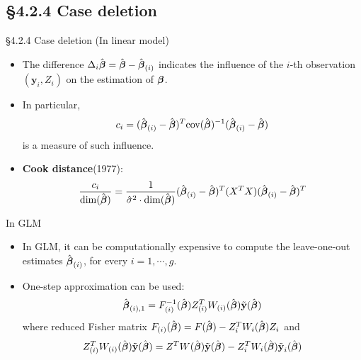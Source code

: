 \documentclass{beamer}
\newcommand{\currentsubsection}{}
\let\oldsubsection\subsection
\renewcommand{\subsection}[1]{\oldsubsection{#1}\renewcommand{\currentsubsection}{#1}}
\begin{document}
\subsection{\S4.2.4 Case deletion}
\begin{frame}{\S4.2.4 Case deletion (In linear model) }
\begin{itemize}
\item
The  difference $\Delta_i\hat{\mbox{\boldmath $\beta$}} = \hat{\mbox{\boldmath $\beta$}}-
\hat{\mbox{\boldmath $\beta$}}_{(i)}$ indicates the influence of the $i$-th observation $(\textbf{y}_i, Z_i)$ on the estimation of
$\mbox{\boldmath $\beta$}$.
\item
In particular, 
$$c_i=(\hat{\mbox{\boldmath $\beta$}}_{(i)}-\hat{\mbox{\boldmath $\beta$}})^T
\mbox{cov}(\hat{\mbox{\boldmath $\beta$}})^{-1}(\hat{\mbox{\boldmath $\beta$}}_{(i)}-
\hat{\mbox{\boldmath $\beta$}})$$ 
is a measure of such influence.
\item {\bf Cook distance}(1977): 
\[ \frac{c_i}{\dim (\hat{\mbox{\boldmath $\beta$}})}=\frac{1}{\hat{\sigma}^2
\cdot \dim (\hat{\mbox{\boldmath $\beta$}})}(\hat{\mbox{\boldmath $\beta$}}_{(i)}-\hat{\mbox{\boldmath $\beta$}})^T
(X^TX)(\hat{\mbox{\boldmath $\beta$}}_{(i)}-\hat{\mbox{\boldmath $\beta$}})^T\]

\end{itemize}
\end{frame}

\begin{frame}{In GLM}
\begin{itemize}


\item
In GLM, it can be computationally expensive to compute the leave-one-out estimates 
$\hat{\mbox{\boldmath $\beta$}}_{(i)}$, for every $i=1,\cdots, g$. 

\item
One-step approximation can be used:
$$\hat{\mbox{\boldmath $\beta$}}_{(i),1}=F_{(i)}^{-1}(\hat{\mbox{\boldmath $\beta$}})Z_{(i)}^T
W_{(i)}(\hat{\mbox{\boldmath $\beta$}})\tilde{\textbf{y}}(\hat{\mbox{\boldmath $\beta$}})$$
where reduced Fisher matrix $F_{(i)}(\hat{\mbox{\boldmath $\beta$}})=F(\hat{\mbox{\boldmath $\beta$}})
-Z_i^TW_i(\hat{\mbox{\boldmath $\beta$}})Z_i$ and
$$Z_{(i)}^TW_{(i)}(\hat{\mbox{\boldmath $\beta$}})\tilde{\textbf{y}}(\hat{\mbox{\boldmath $\beta$}})
=Z^TW(\hat{\mbox{\boldmath $\beta$}})\tilde{\textbf{y}}(\hat{\mbox{\boldmath $\beta$}})-
Z_i^TW_i(\hat{\mbox{\boldmath $\beta$}})\tilde{\textbf{y}}_i(\hat{\mbox{\boldmath $\beta$}})$$


\end{itemize}

\end{frame}
\end{document}
